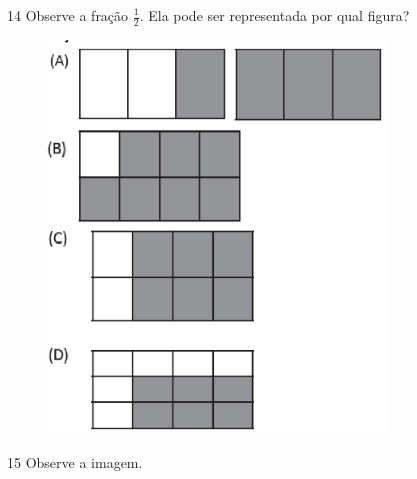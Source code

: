 \pagebreak
\num{14} Observe a fração $\frac{1}{2}$. Ela pode ser representada por qual figura?

\begin{figure}[H]
\includegraphics[width=3.57531in,height=4.10869in]{./imgSAEB_6_MAT/media/image111.png}
\end{figure}



\num{15} Observe a imagem.

